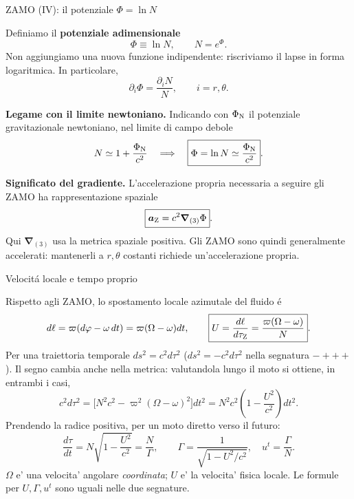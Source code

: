 \begin{frame}[t]{ZAMO (IV): il potenziale $\Phi=\ln N$}
\small\raggedright

Definiamo il \textbf{potenziale adimensionale}
\[
\boxed{\Phi\equiv\ln N},
\qquad N=e^\Phi.
\]
Non aggiungiamo una nuova funzione indipendente:
riscriviamo il lapse in forma logaritmica.
In particolare,
\[
\boxed{\partial_i\Phi=\frac{\partial_iN}{N}},
\qquad i=r,\theta.
\]

\textbf{Legame con il limite newtoniano.}
Indicando con $\Phi_{\rm N}$ il potenziale gravitazionale
newtoniano, nel limite di campo debole
\[
N\simeq1+\frac{\Phi_{\rm N}}{c^2}
\quad\Longrightarrow\quad
\boxed{\Phi=\ln N\simeq\frac{\Phi_{\rm N}}{c^2}}.
\]

\textbf{Significato del gradiente.}
L'accelerazione propria necessaria a seguire gli ZAMO
ha rappresentazione spaziale
\[
\boxed{\boldsymbol a_{\rm Z}
=c^2\boldsymbol\nabla_{(3)}\Phi}.
\]
Qui $\boldsymbol\nabla_{(3)}$ usa la metrica spaziale positiva.
Gli ZAMO sono quindi generalmente accelerati:
mantenerli a $r,\theta$ costanti richiede un'accelerazione propria.

\end{frame}

\begin{frame}[t]{Velocit\'a locale e tempo proprio}
\small\raggedright
Rispetto agli ZAMO, lo spostamento locale azimutale del fluido \'e
\[
d\ell=\varpi(d\varphi-\omega\,dt)
     =\varpi(\Omega-\omega)dt,
\qquad
\boxed{U=\frac{d\ell}{d\tau_{\rm Z}}
       =\frac{\varpi(\Omega-\omega)}{N}}.
\]
Per una traiettoria temporale $ds^2=c^2d\tau^2$
($ds^2=-c^2d\tau^2$ nella segnatura $-+++$).
Il segno cambia anche nella metrica: valutandola lungo il moto si ottiene, in entrambi i casi,
\[
c^2d\tau^2
=\bigl[N^2c^2-\varpi^2(\Omega-\omega)^2\bigr]dt^2
=N^2c^2\left(1-\frac{U^2}{c^2}\right)dt^2.
\]
Prendendo la radice positiva, per un moto diretto verso il futuro:
\[
\frac{d\tau}{dt}=N\sqrt{1-\frac{U^2}{c^2}}
=\frac{N}{\Gamma},
\qquad
\boxed{\Gamma=\frac1{\sqrt{1-U^2/c^2}},\quad u^t=\frac{\Gamma}{N}}.
\]
$\Omega$ e' una velocita' angolare \emph{coordinata}; $U$ e' la velocita' fisica locale.
Le formule per $U,\Gamma,u^t$ sono uguali nelle due segnature.
\end{frame}


